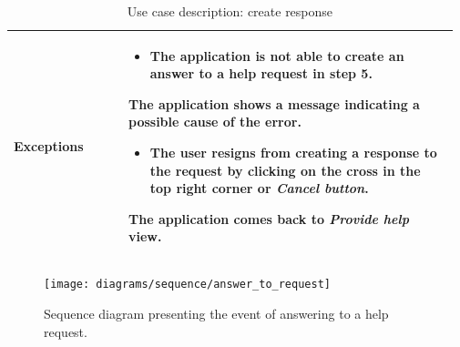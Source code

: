 \begin{table}[H]
\begin{tabular}{@{}p{0.25\linewidth} p{0.72\linewidth}@{}}
		\textbf{Exceptions}         & 
	    \begin{itemize}[leftmargin=.4cm,noitemsep,topsep=0pt,before=\vspace{-3mm}]
		   \item The application is not able to create an answer to a help request in step 5. 
		\end{itemize}
		The application shows a message indicating a possible cause of the error.
		\begin{itemize}[leftmargin=.4cm,noitemsep,topsep=0pt,before=\vspace{-3mm}]
		   \item The user resigns from creating a response to the request by clicking on the cross in the top right corner or \textit{Cancel button}. 
		\end{itemize}
		The application comes back to \textit{Provide help} view.
		\\\bottomrule
	\end{tabular}
	\caption{Use case description: create response} 
\end{table}

\begin{figure}[H]
    \centering
    \texttt{[image: diagrams/sequence/answer\_to\_request]}
    \caption{Sequence diagram presenting the event of answering to a help request. }
    \label{fig:sd_answer_to_request}
\end{figure}

